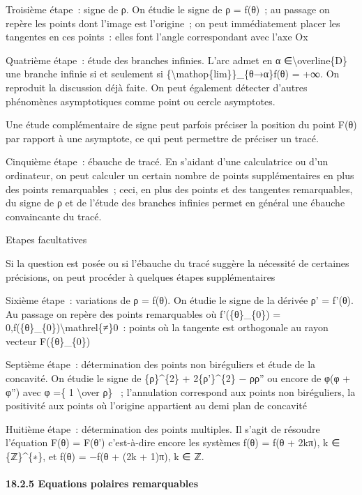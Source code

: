 \documentclass[]{article}
\begin{document}
Troisième étape~: signe de ρ. On étudie le signe de ρ = f(θ)~; au
passage on repère les points dont l'image est l'origine~; on peut
immédiatement placer les tangentes en ces points~: elles font l'angle
correspondant avec l'axe Ox

Quatrième étape~: étude des branches infinies. L'arc admet en α
∈\textbackslash{}overline\{D\} une branche infinie si et seulement si
\{\textbackslash{}mathop\{lim\}\}\_\{θ→α\}\textbar{}f(θ)\textbar{} = +∞.
On reproduit la discussion déjà faite. On peut également détecter
d'autres phénomènes asymptotiques comme point ou cercle asymptotes.

Une étude complémentaire de signe peut parfois préciser la position du
point F(θ) par rapport à une asymptote, ce qui peut permettre de
préciser un tracé.

Cinquième étape~: ébauche de tracé. En s'aidant d'une calculatrice ou
d'un ordinateur, on peut calculer un certain nombre de points
supplémentaires en plus des points remarquables~; ceci, en plus des
points et des tangentes remarquables, du signe de ρ et de l'étude des
branches infinies permet en général une ébauche convaincante du tracé.

Etapes facultatives

Si la question est posée ou si l'ébauche du tracé suggère la nécessité
de certaines précisions, on peut procéder à quelques étapes
supplémentaires

Sixième étape~: variations de ρ = f(θ). On étudie le signe de la dérivée
ρ' = f'(θ). Au passage on repère des points remarquables où
f'(\{θ\}\_\{0\}) = 0,f(\{θ\}\_\{0\})\textbackslash{}mathrel\{≠\}0~:
points où la tangente est orthogonale au rayon vecteur F(\{θ\}\_\{0\})

Septième étape~: détermination des points non biréguliers et étude de la
concavité. On étudie le signe de \{ρ\}\^{}\{2\} + 2\{ρ'\}\^{}\{2\} −
ρρ'' ou encore de φ(φ + φ'') avec φ =\{ 1 \textbackslash{}over ρ\} ~;
l'annulation correspond aux points non biréguliers, la positivité aux
points où l'origine appartient au demi plan de concavité

Huitième étape~: détermination des points multiples. Il s'agit de
résoudre l'équation F(θ) = F(θ') c'est-à-dire encore les systèmes f(θ) =
f(θ + 2kπ), k ∈ \{ℤ\}\^{}\{∗\}, et f(θ) = −f(θ + (2k + 1)π), k ∈ ℤ.

\paragraph{18.2.5 Equations polaires remarquables}
\end{document}

